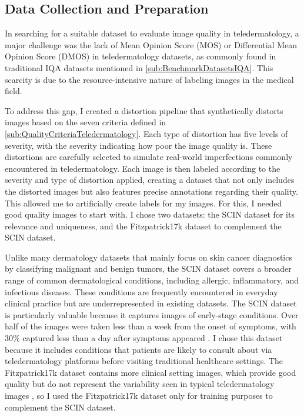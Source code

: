 \subsection{Data Collection and Preparation}
\label{sub:DataCollection}
In searching for a suitable dataset to evaluate image quality in teledermatology, a major challenge was the lack of Mean Opinion Score (MOS) or Differential Mean Opinion Score (DMOS) in teledermatology datasets, as commonly found in traditional IQA datasets mentioned in \autoref{sub:BenchmarkDatasetsIQA}. This scarcity is due to the resource-intensive nature of labeling images in the medical field. \par
\vspace{\baselineskip}
\noindent
To address this gap, I created a distortion pipeline that synthetically distorts images based on the seven criteria defined in \autoref{sub:QualityCriteriaTeledermatology}. Each type of distortion has five levels of severity, with the severity indicating how poor the image quality is. These distortions are carefully selected to simulate real-world imperfections commonly encountered in teledermatology. Each image is then labeled according to the severity and type of distortion applied, creating a dataset that not only includes the distorted images but also features precise annotations regarding their quality. This allowed me to artificially create labels for my images. For this, I needed good quality images to start with. I chose two datasets: the SCIN dataset for its relevance and uniqueness, and the Fitzpatrick17k dataset to complement the SCIN dataset. \par
\vspace{\baselineskip}
\noindent
Unlike many dermatology datasets that mainly focus on skin cancer diagnostics by classifying malignant and benign tumors, the SCIN dataset covers a broader range of common dermatological conditions, including allergic, inflammatory, and infectious diseases. These conditions are frequently encountered in everyday clinical practice but are underrepresented in existing datasets. The SCIN dataset is particularly valuable because it captures images of early-stage conditions. Over half of the images were taken less than a week from the onset of symptoms, with 30\% captured less than a day after symptoms appeared \autocite{SCIN}.  I chose this dataset because it includes conditions that patients are likely to consult about via teledermatology platforms before visiting traditional healthcare settings. The Fitzpatrick17k dataset contains more clinical setting images, which provide good quality but do not represent the variability seen in typical teledermatology images \autocite{F17K}, so I used the Fitzpatrick17k dataset only for training purposes to complement the SCIN dataset. \par 
